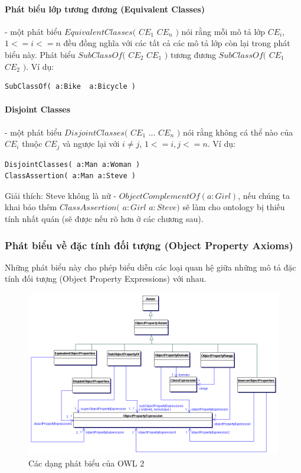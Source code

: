 \paragraph{Phát biểu lớp tương đương (Equivalent Classes)} - một phát biểu $EquivalentClasses($ $CE_{1}$ $CE_{n}$ $)$ nói rằng mỗi mô tả lớp $CE_{i}$, $1<=i<=n$ đều đồng nghĩa với các tất cả các mô tả lớp còn lại trong phát biểu này. Phát biểu $SubClassOf($ $CE_{2}$ $CE_{1}$ $)$ tương đương $SubClassOf($ $CE_{1}$ $CE_{2}$ $)$. Ví dụ:
\begin{verbatim}
SubClassOf( a:Bike  a:Bicycle )
\end{verbatim}

\paragraph{Disjoint Classes} - một phát biểu $DisjointClasses($ $CE_{1}$ ... $CE_{n}$ $)$ nói rằng không cá thể nào của $CE_{i}$ thuộc $CE_{j}$ và ngược lại với $i \neq j$, $1<=i,j<=n$. Ví dụ:
\begin{verbatim}
DisjointClasses( a:Man a:Woman )	
ClassAssertion( a:Man a:Steve )
\end{verbatim}
Giải thích: Steve không là nữ - $ObjectComplementOf( a:Girl )$, nếu chúng ta khai báo thêm $ClassAssertion($ $a:Girl$ $a:Steve)$ sẽ làm cho ontology bị thiếu tính nhất quán (sẽ được nếu rõ hơn ở các chương sau).

\subsubsection{Phát biểu về đặc tính đối tượng (Object Property Axioms)}
Những phát biểu này cho phép biểu diễn các loại quan hệ giữa những mô tả đặc tính đối tượng (Object Property Expressions) với nhau.
\begin{figure}[h]
	\centering
	\includegraphics[width=120mm]{Figures/objectpropertyAxiom.png}
	\caption{Các dạng phát biểu của OWL 2\label{overflow}}
\end{figure}

